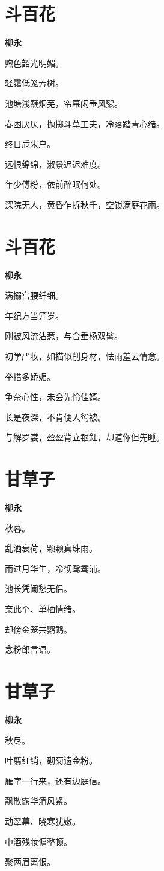 \documentclass[12pt,a4paper]{ctexbook}
\begin{document}
\section{斗百花}
\textbf{柳永}\par\vspace{0.5em}
煦色韶光明媚。\par
轻霭低笼芳树。\par
池塘浅蘸烟芜，帘幕闲垂风絮。\par
春困厌厌，抛掷斗草工夫，冷落踏青心绪。\par
终日卮朱户。\par
远恨绵绵，淑景迟迟难度。\par
年少傅粉，依前醉眠何处。\par
深院无人，黄昏乍拆秋千，空锁满庭花雨。\par

\section{斗百花}
\textbf{柳永}\par\vspace{0.5em}
满搦宫腰纤细。\par
年纪方当笄岁。\par
刚被风流沾惹，与合垂杨双髻。\par
初学严妆，如描似削身材，怯雨羞云情意。\par
举措多娇媚。\par
争奈心性，未会先怜佳婿。\par
长是夜深，不肯便入鸳被。\par
与解罗裳，盈盈背立银釭，却道你但先睡。\par

\section{甘草子}
\textbf{柳永}\par\vspace{0.5em}
秋暮。\par
乱洒衰荷，颗颗真珠雨。\par
雨过月华生，冷彻鸳鸯浦。\par
池长凭阑愁无侣。\par
奈此个、单栖情绪。\par
却傍金笼共鹦鹉。\par
念粉郎言语。\par

\section{甘草子}
\textbf{柳永}\par\vspace{0.5em}
秋尽。\par
叶翦红绡，砌菊遗金粉。\par
雁字一行来，还有边庭信。\par
飘散露华清风紧。\par
动翠幕、晓寒犹嫩。\par
中酒残妆慵整顿。\par
聚两眉离恨。\par
\end{document}
